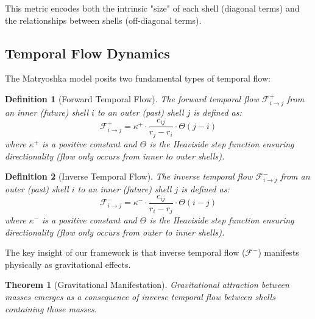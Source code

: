 \documentclass[12pt,a4paper]{article}
\newtheorem{theorem}{Theorem}[section]
\newtheorem{definition}{Definition}[section]
\begin{document}
This metric encodes both the intrinsic "size" of each shell (diagonal terms) and the relationships between shells (off-diagonal terms).

\subsection{Temporal Flow Dynamics}
\label{subsec:temporal-flow}

The Matryoshka model posits two fundamental types of temporal flow:

\begin{definition}[Forward Temporal Flow]
\label{def:forward-flow}
The forward temporal flow $\mathcal{F}^+_{i \to j}$ from an inner (future) shell $i$ to an outer (past) shell $j$ is defined as:
\begin{equation}
\mathcal{F}^+_{i \to j} = \kappa^+ \cdot \frac{c_{ij}}{r_j - r_i} \cdot \Theta(j - i)
\end{equation}
where $\kappa^+$ is a positive constant and $\Theta$ is the Heaviside step function ensuring directionality (flow only occurs from inner to outer shells).
\end{definition}

\begin{definition}[Inverse Temporal Flow]
\label{def:inverse-flow}
The inverse temporal flow $\mathcal{F}^-_{i \to j}$ from an outer (past) shell $i$ to an inner (future) shell $j$ is defined as:
\begin{equation}
\mathcal{F}^-_{i \to j} = \kappa^- \cdot \frac{c_{ij}}{r_i - r_j} \cdot \Theta(i - j)
\end{equation}
where $\kappa^-$ is a positive constant and $\Theta$ is the Heaviside step function ensuring directionality (flow only occurs from outer to inner shells).
\end{definition}

The key insight of our framework is that inverse temporal flow ($\mathcal{F}^-$) manifests physically as gravitational effects.

\begin{theorem}[Gravitational Manifestation]
\label{thm:gravitational-manifestation}
Gravitational attraction between masses emerges as a consequence of inverse temporal flow between shells containing those masses.
\end{theorem}
\end{document}
